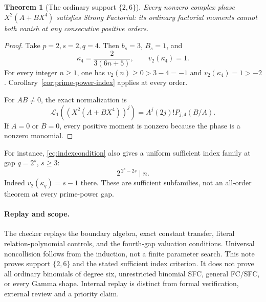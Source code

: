 \documentclass[11pt]{article}
\newtheorem{theorem}[lemma]{Theorem}
\begin{document}
\begin{theorem}[The ordinary support $\{2,6\}$]\label{thm:fourth-gap}
Every nonzero complex phase $X^2(A+BX^4)$ satisfies Strong Factorial:
its ordinary factorial moments cannot both vanish at any consecutive
positive orders.
\end{theorem}
\begin{proof}
Take $p=2,s=2,q=4$. Then $b_s=3$, $B_s=1$, and
\[
 \kappa_4=\frac2{3(6n+5)},\qquad v_2(\kappa_4)=1.
\]
For every integer $n\ge1$, one has $v_2(n)\ge0>3-4=-1$
and $v_2(\kappa_4)=1>-2$.
Corollary~\ref{cor:prime-power-index} applies at every order.

For $AB\ne0$, the exact normalization is
\[
 \mathcal L_1((X^2(A+BX^4))^j)
       =A^j(2j)!P_{j,4}(B/A).
\]
If $A=0$ or $B=0$, every positive moment is nonzero because
the phase is a nonzero monomial.
\end{proof}

For instance, \eqref{eq:indexcondition} also gives a uniform
sufficient index family at gap $q=2^s$, $s\ge3$:
\[
                    2^{\,2^s-2s}\mid n.
\]
Indeed $v_2(\kappa_q)=s-1$ there. These are sufficient subfamilies,
not an all-order theorem at every prime-power gap.

\paragraph{Replay and scope.}
The checker replays the boundary algebra, exact constant transfer,
literal relation-polynomial controls, and the fourth-gap valuation
conditions. Universal noncollision follows from the induction,
not a finite parameter search.
This note proves support $\{2,6\}$ and the stated sufficient index
criterion. It does not prove all ordinary binomials of degree six,
unrestricted binomial SFC, general FC/SFC, or every Gamma shape.
Internal replay is distinct from formal verification, external
review and a priority claim.
\end{document}
